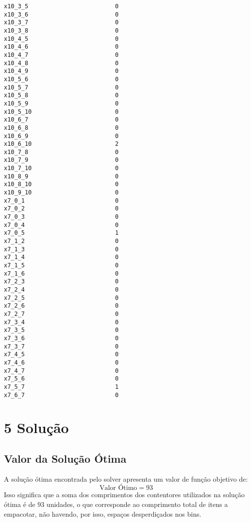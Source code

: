 \documentclass[a4paper,12pt]{article}
\begin{document}
\begin{lstlisting}
x10_3_5                         0
x10_3_6                         0
x10_3_7                         0
x10_3_8                         0
x10_4_5                         0
x10_4_6                         0
x10_4_7                         0
x10_4_8                         0
x10_4_9                         0
x10_5_6                         0
x10_5_7                         0
x10_5_8                         0
x10_5_9                         0
x10_5_10                        0
x10_6_7                         0
x10_6_8                         0
x10_6_9                         0
x10_6_10                        2
x10_7_8                         0
x10_7_9                         0
x10_7_10                        0
x10_8_9                         0
x10_8_10                        0
x10_9_10                        0
x7_0_1                          0
x7_0_2                          0
x7_0_3                          0
x7_0_4                          0
x7_0_5                          1
x7_1_2                          0
x7_1_3                          0
x7_1_4                          0
x7_1_5                          0
x7_1_6                          0
x7_2_3                          0
x7_2_4                          0
x7_2_5                          0
x7_2_6                          0
x7_2_7                          0
x7_3_4                          0
x7_3_5                          0
x7_3_6                          0
x7_3_7                          0
x7_4_5                          0
x7_4_6                          0
x7_4_7                          0
x7_5_6                          0
x7_5_7                          1
x7_6_7                          0
\end{lstlisting}

\section*{5 Solução}
\subsection*{Valor da Solução Ótima}
A solução ótima encontrada pelo solver apresenta um valor de função objetivo de:
\begin{equation}
\text{Valor Ótimo} = 93
\end{equation}
Isso significa que a soma dos comprimentos dos contentores utilizados na solução ótima é de 93 unidades, o que corresponde ao comprimento total de itens a empacotar, não havendo, por isso, espaços desperdiçados nos bins.
\end{document}

